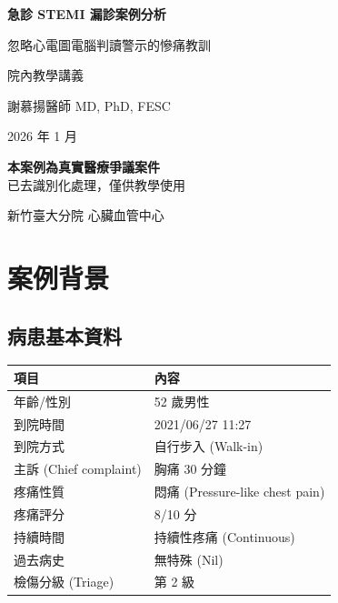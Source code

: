 \documentclass[12pt,a4paper]{article}
\begin{document}
\begin{titlepage}
\centering
\vspace*{2cm}

{\Huge\bfseries\color{emergency_red} 急診 STEMI 漏診案例分析}

\vspace{0.5cm}

{\LARGE\color{emergency_blue} 忽略心電圖電腦判讀警示的慘痛教訓}

\vspace{2cm}

{\Large 院內教學講義}

\vspace{1cm}

{\large 謝慕揚醫師 MD, PhD, FESC}

\vspace{0.5cm}

{\large 2026 年 1 月}

\vspace{2cm}

\begin{alertbox}
\centering
\textbf{本案例為真實醫療爭議案件}\\
已去識別化處理，僅供教學使用
\end{alertbox}

\vfill

{\small 新竹臺大分院 心臟血管中心}

\end{titlepage}

\tableofcontents
\newpage

\section{案例背景}

\subsection{病患基本資料}

\begin{longtable}{p{4cm}p{10cm}}
\toprule
\textbf{項目} & \textbf{內容} \\
\midrule
\endhead
年齡/性別 & 52 歲男性 \\
到院時間 & 2021/06/27 11:27 \\
到院方式 & 自行步入 (Walk-in) \\
主訴 (Chief complaint) & 胸痛 30 分鐘 \\
疼痛性質 & 悶痛 (Pressure-like chest pain) \\
疼痛評分 & 8/10 分 \\
持續時間 & 持續性疼痛 (Continuous) \\
過去病史 & 無特殊 (Nil) \\
檢傷分級 (Triage) & 第 2 級 \\
\bottomrule
\end{longtable}
\end{document}
